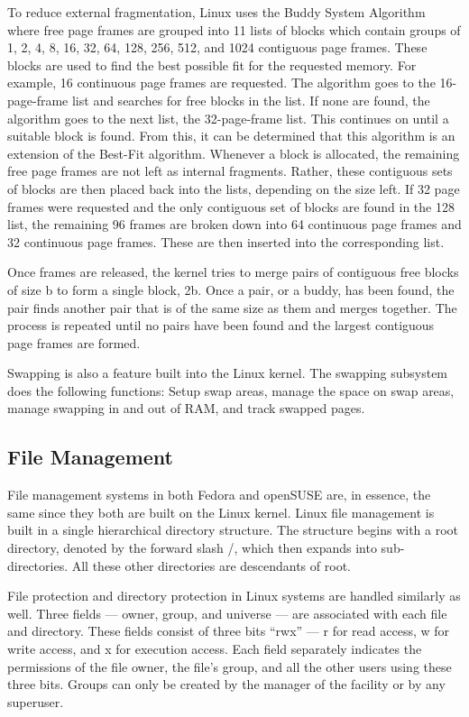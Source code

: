 \documentclass{article}
\begin{document}
To reduce external fragmentation, Linux uses the Buddy System Algorithm where
free page frames are grouped into 11 lists of blocks which contain groups of 1,
2, 4, 8, 16, 32, 64, 128, 256, 512, and 1024 contiguous page frames. These
blocks are used to find the best possible fit for the requested memory. For
example, 16 continuous page frames are requested. The algorithm goes to the
16-page-frame list and searches for free blocks in the list. If none are found,
the algorithm goes to the next list, the 32-page-frame list. This continues on
until a suitable block is found. From this, it can be determined that this
algorithm is an extension of the Best-Fit algorithm. Whenever a block is
allocated, the remaining free page frames are not left as internal fragments.
Rather, these contiguous sets of blocks are then placed back into the lists,
depending on the size left. If 32 page frames were requested and the only
contiguous set of blocks are found in the 128 list, the remaining 96 frames are
broken down into 64 continuous page frames and 32 continuous page frames. These
are then inserted into the corresponding list.

Once frames are released, the kernel tries to merge pairs of contiguous free
blocks of size b to form a single block, 2b. Once a pair, or a buddy, has been
found, the pair finds another pair that is of the same size as them and merges
together. The process is repeated until no pairs have been found and the largest
contiguous page frames are formed. \parencite[311-312]{linux}

Swapping is also a feature built into the Linux kernel. The swapping subsystem
does the following functions: Setup swap areas, manage the space on swap areas,
manage swapping in and out of RAM, and track swapped pages.
\parencite[713]{linux}

\subsection{File Management}
File management systems in both Fedora and openSUSE are, in essence, the same
since they both are built on the Linux kernel. Linux file management is built in
a single hierarchical directory structure. The structure begins with a root
directory, denoted by the forward slash /, which then expands into
sub-directories. All these other directories are descendants of root.
\parencite{linux_file_system_management}

File protection and directory protection in Linux systems are handled similarly
as well. Three fields --- owner, group, and universe --- are associated with
each file and directory. These fields consist of three bits “rwx” --- r for read
access, w for write access, and x for execution access. Each field separately
indicates the permissions of the file owner, the file’s group, and all the other
users using these three bits. Groups can only be created by the manager of the
facility or by any superuser. \parencite[553-554]{os}
\end{document}
